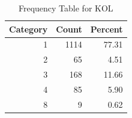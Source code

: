 \begin{table}[!h]
\centering
\caption{\label{tab:tab:KOL}Frequency Table for KOL}
\centering
\begin{tabular}[t]{rrr}
\toprule
Category & Count & Percent\\
\midrule
1 & 1114 & 77.31\\
2 & 65 & 4.51\\
3 & 168 & 11.66\\
4 & 85 & 5.90\\
8 & 9 & 0.62\\
\bottomrule
\end{tabular}
\end{table}
